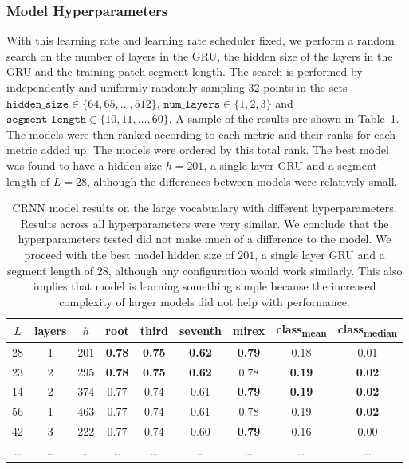 \subsubsection{Model Hyperparameters}

With this learning rate and learning rate scheduler fixed, we perform a random search on the number of layers in the GRU, the hidden size of the layers in the GRU and the training patch segment length. The search is performed by independently and uniformly randomly sampling 32 points in the sets $\texttt{hidden\_size}\in\{64,65,\ldots,512\}$, $\texttt{num\_layers}\in\{1,2,3\}$ and $\texttt{segment\_length}\in\{10,11,\ldots,60\}$. A sample of the results are shown in Table~\ref{tab:crnn_hparams}. The models were then ranked according to each metric and their ranks for each metric added up. The models were ordered by this total rank. The best model was found to have a hidden size $h=201$, a single layer GRU and a segment length of $L=28$, although the differences between models were relatively small.

\begin{table}[h]
    \centering
    \begin{tabular}{ccccccccc}
        \toprule
        $L$ & layers & $h$ & root & third & seventh & mirex & class\textsubscript{mean} & class\textsubscript{median} \\
        \midrule
        28 & 1 & 201 & \textbf{0.78} & \textbf{0.75} & \textbf{0.62} & \textbf{0.79} & 0.18 & 0.01 \\
        23 & 2 & 295 & \textbf{0.78} & \textbf{0.75} & \textbf{0.62} & 0.78 & \textbf{0.19} & \textbf{0.02} \\
        14 & 2 & 374 & 0.77 & 0.74 & 0.61 & \textbf{0.79} & \textbf{0.19} & \textbf{0.02} \\
        56 & 1 & 463 & 0.77 & 0.74 & 0.61 & 0.78 & 0.19 & \textbf{0.02} \\
        42 & 3 & 222 & 0.77 & 0.74 & 0.60 & \textbf{0.79} & 0.16 & 0.00 \\
        \ldots & \ldots & \ldots & \ldots & \ldots & \ldots & \ldots & \ldots & \ldots \\
        \bottomrule
    \end{tabular}
    \caption{CRNN model results on the large vocabualary with different hyperparameters. Results across all hyperparameters were very similar. We conclude that the hyperparameters tested did not make much of a difference to the model. We proceed with the best model hidden size of $201$, a single layer GRU and a segment length of $28$, although any configuration would work similarly. This also implies that model is learning something simple because the increased complexity of larger models did not help with performance.}\label{tab:crnn_hparams}
\end{table}

